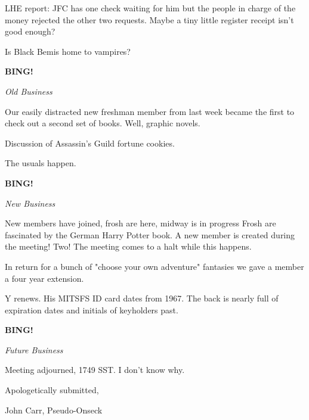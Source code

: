 \documentclass[12pt]{article}
\newcommand{\bing}{{\bf BING!} }
\newcommand{\goto}[1]{\bing \vskip 12pt \centerline{{\em{#1}}}}
\begin{document}
LHE report: JFC has one check waiting for him but the people in charge of the money rejected the other two requests. Maybe a tiny little register receipt isn't good enough?

Is Black Bemis home to vampires?

\goto{Old Business}

Our easily distracted new freshman member from last week became the first to check out a second set of books. Well, graphic novels.

Discussion of Assassin's Guild fortune cookies.

The usuals happen.

\goto{New Business}

New members have joined, frosh are here, midway is in progress Frosh are fascinated by the German Harry Potter book. A new member is created during the meeting! Two! The meeting comes to a halt while this happens.

In return for a bunch of "choose your own adventure" fantasies we gave a member a four year extension.

Y renews. His MITSFS ID card dates from 1967. The back is nearly full of expiration dates and initials of keyholders past.

\goto{Future Business}

\vspace{12pt}

\noindent
Meeting adjourned, 1749 SST. I don't know why.

\vspace{18pt}

\centerline{Apologetically submitted,}
\centerline{John Carr, Pseudo-Onseck}
\end{document}
